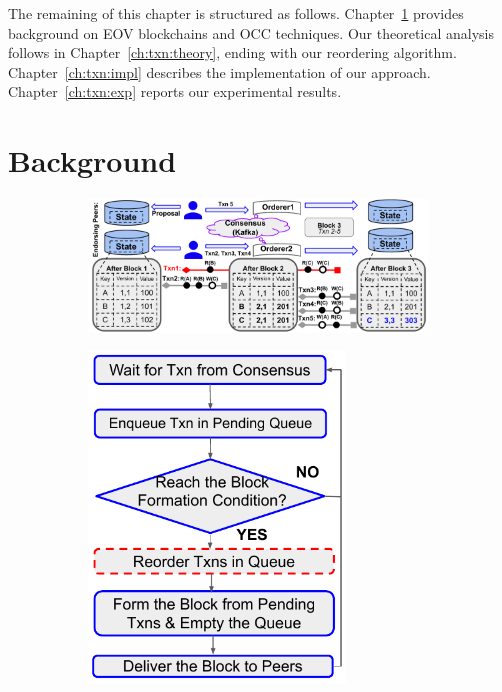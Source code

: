 The remaining of this chapter is structured as follows.
%
Chapter~\ref{ch:txn:background} provides background on EOV blockchains and OCC techniques. 
%
Our theoretical analysis follows in Chapter~\ref{ch:txn:theory}, ending with our
reordering algorithm.
%
Chapter~\ref{ch:txn:impl} describes the implementation of our approach.
%
Chapter~\ref{ch:txn:exp} reports our experimental results.

\section{Background}
\label{ch:txn:background}
\begin{figure}[h!]
    \begin{subfigure}{0.71\textwidth}
      \centering
      \includegraphics[width=0.99\textwidth]{diagram/txn/background.pdf}
      \caption{}
      \label{diagram:txn:background_fabric}
    \end{subfigure}
    \begin{subfigure}{0.28\textwidth}
      \centering
      \includegraphics[width=0.75\textwidth]{diagram/txn/fabric_orderer.pdf}

\end{subfigure}
\end{figure}
